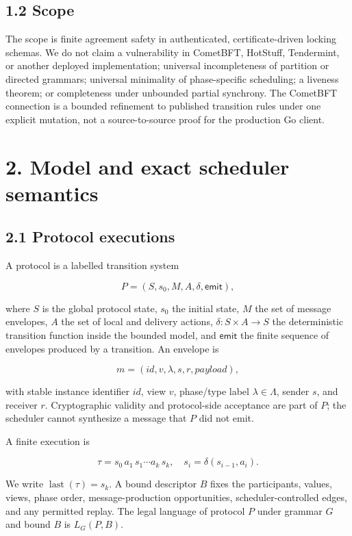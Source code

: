 \subsection{1.2 Scope}\label{scope}

The scope is finite agreement safety in authenticated,
certificate-driven locking schemas. We do not claim a vulnerability in
CometBFT, HotStuff, Tendermint, or another deployed implementation;
universal incompleteness of partition or directed grammars; universal
minimality of phase-specific scheduling; a liveness theorem; or
completeness under unbounded partial synchrony. The CometBFT connection
is a bounded refinement to published transition rules under one explicit
mutation, not a source-to-source proof for the production Go client.

\section{2. Model and exact scheduler
semantics}\label{model-and-exact-scheduler-semantics}

\subsection{2.1 Protocol executions}\label{protocol-executions}

A protocol is a labelled transition system

\[
P=(S,s_0,M,A,\delta,\mathsf{emit}),
\]

where \(S\) is the global protocol state, \(s_0\) the initial state,
\(M\) the set of message envelopes, \(A\) the set of local and delivery
actions, \(\delta:S\times A\to S\) the deterministic transition function
inside the bounded model, and \(\mathsf{emit}\) the finite sequence of
envelopes produced by a transition. An envelope is

\[
m=(\mathit{id},v,\lambda,s,r,\mathit{payload}),
\]

with stable instance identifier \(\mathit{id}\), view \(v\), phase/type
label \(\lambda\in\Lambda\), sender \(s\), and receiver \(r\).
Cryptographic validity and protocol-side acceptance are part of \(P\);
the scheduler cannot synthesize a message that \(P\) did not emit.

A finite execution is

\[
\tau=s_0\,a_1\,s_1\cdots a_k\,s_k,
\quad s_i=\delta(s_{i-1},a_i).
\]

We write \(\operatorname{last}(\tau)=s_k\). A bound descriptor \(B\)
fixes the participants, values, views, phase order, message-production
opportunities, scheduler-controlled edges, and any permitted replay. The
legal language of protocol \(P\) under grammar \(G\) and bound \(B\) is
\(L_G(P,B)\).

